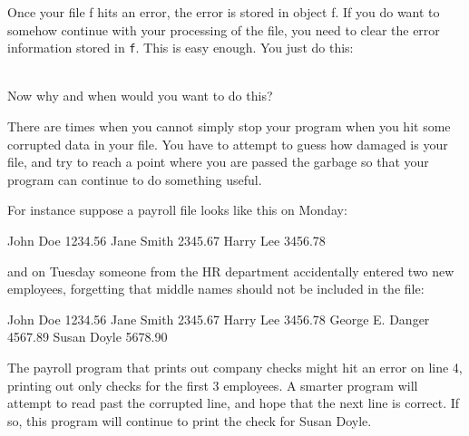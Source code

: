 \begin{consolethree}[escapeinside=||]
\begin{console}
double total = 0.0;
bool error = false;
while (!f.eof())
{   
     char[100] fname;
     char[100] lname;
     double pay;
     f >> fname >> lname >> pay;
     if (f.good())
     {
          total += pay;
          std::cout << fname << ' ' << lname
                    << " is paid "
                    << pay << std::endl;
}
else
{    
     error = true;
     break;
}
if (!error) // or use f.good()
{    
     std::cout << "total: " << total << std::endl;
}
else
{
std::cout << "DATA IN FILE IS CORRUPTED!!!"
          << std::endl;
}
\end{console}

\newpage{}

Once your file f hits an error, the error is stored in object f. If you do want to somehow continue with your processing of the file, you need to clear the error information stored in \texttt{f}. This is easy enough. You just do this:

\\

Now why and when would you want to do this?

There are times when you cannot simply stop your program when you hit
some corrupted data in your file. You have to attempt to guess how
damaged is your file, and try to reach a point where you are passed the
garbage so that your program can continue to do something useful.

For instance suppose a payroll file looks like this on Monday:

\begin{console}
John Doe 1234.56
Jane Smith 2345.67
Harry Lee 3456.78
\end{console}

and on Tuesday someone from the HR department accidentally entered two
new employees, forgetting that middle names should not be included in
the file:

\begin{console}
John Doe 1234.56
Jane Smith 2345.67
Harry Lee 3456.78
George E. Danger 4567.89
Susan Doyle 5678.90
\end{console}

The payroll program that prints out company checks might hit an error on line 4, printing out only checks for the first 3 employees. A smarter program will attempt to read past the corrupted line, and hope that the next line is correct. If so, this program will continue to print the check for Susan Doyle.


\end{consolethree}
